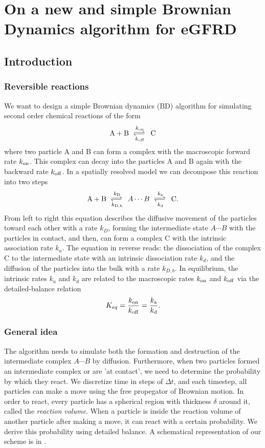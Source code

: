 \section{On a new and simple Brownian Dynamics algorithm for eGFRD}

\subsection{Introduction}

\subsubsection{Reversible reactions}
We want to design a simple Brownian dynamics (BD) algorithm for simulating second order chemical reactions of the form
\begin{equation}
{\rm A} + {\rm B} \rates{k_{\rm on}}{k_{\rm off}} {\rm C}
\end{equation}
where two particle A and B can form a complex with the macroscopic forward rate $k_{\rm on}$. This complex can decay into the particles A and B again with the backward rate $k_{\rm off}$. In a spatially resolved model we can decompose this reaction into two steps \cite{Agmon1990}
\begin{equation}
{\rm A} + {\rm B} \rates{k_{\rm D}}{k_{\rm D,b}} A \cdots B \rates{k_{\rm a}}{k_{\rm d}} {\rm C}.
\end{equation}
From left to right this equation describes the diffusive movement of the particles toward each other with a rate $k_D$, forming the intermediate state $A \cdots B$ with the particles in contact, and then, can form a complex C with the intrinsic association rate $k_a$. The equation in reverse reads: the dissociation of the complex C to the intermediate state with an intrinsic dissociation rate $k_d$, and the diffusion of the particles into the bulk with a rate $k_{D,b}$. In equilibrium, the intrinsic rates $k_a$ and $k_d$ are related to the macroscopic rates $k_{\rm on}$ and $k_{\rm off}$ via the detailed-balance relation
\begin{equation}
K_{eq} = \frac{k_{\rm on}}{k_{\rm off}} = \frac{k_{\rm a}}{k_{\rm d}}.
\end{equation}

\subsubsection{General idea}
The algorithm needs to simulate both the formation and destruction of the intermediate complex $A\cdots B$ by diffusion. Furthermore, when two particles formed an intermediate complex or are 'at contact', we need to determine the probability by which they react. We discretize time in steps of $\Delta t$, and each timestep, all particles can make a move using the free propegator of Brownian motion. In order to react, every particle has a spherical region with thickness $\delta$ around it, called the \emph{reaction volume}. When a particle is inside the reaction volume of another particle after making a move, it can react with a certain probability. We derive this probability using detailed balance. A schematical representation of our scheme is in .

